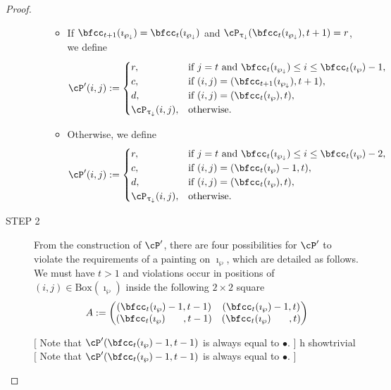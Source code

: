 \documentclass[12pt,a4paper]{amsart}
\newcommand{\trivial}[2][]{\if\relax\detokenize{#1}\relax
  {%
      \color{orange} \vspace{0em} $[$  #2 $]$
      \color{black}
  }
  \else
\ifx#1h
\ifcsname showtrivial\endcsname
{%
    \color{orange} \vspace{0em}  $[$ #2 $]$
    \color{black}
}
\fi
\else {\red Wrong argument!} \fi
\fi
}
\numberwithin{equation}{section}
\theoremstyle{remark}
\def\BOX#1{\mathrm{Box}(#1)}
\begin{document}
\begin{proof}
\begin{description}
\begin{enumerate}[label=(\alph*)]
\begin{itemize}
              \item If $\bfcc_{t+1}(\imath_{\PPm}) = \bfcc_{t}(\imath_{\PPm})$
              and
              $\cP_{\uptaum}(\bfcc_{t}(\imath_{\PPm}),t+1) = r$,
              we define
              \[
                \cP'(i,j) := \begin{cases}
                  r ,& \text{if $j=t$ and $\bfcc_{t}(\imath_{\PPm})\leq i \leq \bfcc_{t}(\imath_{\wp})-1$},\\
                  c ,& \text{if $(i,j)=(\bfcc_{t+1}(\imath_{\PPm}),t+1)$},\\
                  d ,& \text{if $(i,j)=(\bfcc_{t}(\imath_{\wp}),t)$},\\
                  \cP_{\uptaum}(i,j) ,&\text{otherwise}.
                \end{cases}
              \]
              \item Otherwise, we define
              \[
                \cP'(i,j) := \begin{cases}
                  r ,& \text{if $j=t$ and $\bfcc_{t}(\imath_{\PPm})\leq i \leq \bfcc_{t}(\imath_{\wp})-2$},\\
                  c ,& \text{if $(i,j)=(\bfcc_{t}(\imath_{\wp})-1,t)$},\\
                  d ,& \text{if $(i,j)=(\bfcc_{t}(\imath_{\wp}),t)$},\\
                  \cP_{\uptaum}(i,j) ,&\text{otherwise}.
                \end{cases}
              \]
            \end{itemize}
          \end{enumerate}

    \item[STEP 2] From the construction of $\cP'$, there are four possibilities for $\cP'$ to violate the requirements of a painting on $\imath_{\wp}$, which are detailed as follows. We must have $t>1$ and violations occur in positions of $(i,j)\in \BOX{\imath_{\wp}}$ inside the following $2\times 2$ square
         \[
          A :=
          \begin{pmatrix}
            (\bfcc_{t}(\imath_{\wp})-1,t-1) & (\bfcc_{t}(\imath_{\wp})-1,t) \\
            (\bfcc_{t}(\imath_{\wp})\;\phantom{-1}\;,t-1) & (\bfcc_{t}(\imath_{\wp})\;\phantom{-1}\;,t) \\
          \end{pmatrix}
          \]

          \trivial[]{
          Note that  $\cP'(\bfcc_{t}(\imath_{\wp})-1,t-1)$ is always equal to
          $\bullet$.
          }


\end{description}
\end{proof}
\end{document}
